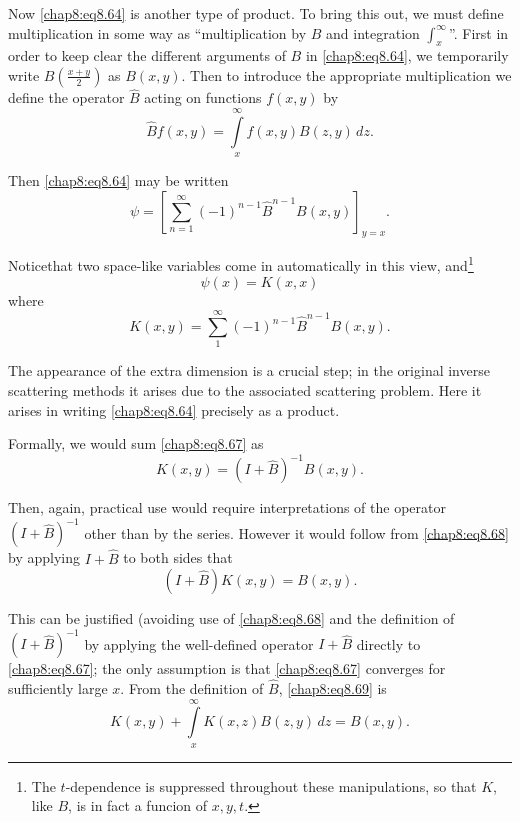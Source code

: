 Now \eqref{chap8:eq8.64} is another type of product. To bring this out, we must define multiplication in some way as ``multiplication by $B$ and integration $\int_x^\infty$''. First in order to keep clear the different arguments of $B$ in \eqref{chap8:eq8.64}, we temporarily write $B(\frac{x+y}{2})$ as $B(x,y)$. Then to introduce the appropriate multiplication we define the operator $\hat{B}$ acting on functions $f(x,y)$ by 
\begin{equation}
\hat{B}f(x,y)=\int\limits_x^\infty f(x,y)B(z,y)\,dz. \tag{8.65}\label{chap8:eq8.65}
\end{equation}

Then \eqref{chap8:eq8.64} may be written 
\begin{equation}
\psi=\left[\sum\limits_{n=1}^\infty(-1)^{n-1}\hat{B}^{n-1}B(x,y)\right]_{y=x}. \tag{8.66}\label{chap8:eq8.66}
\end{equation}

Notice\pageoriginale that two space-like variables come in automatically in this view, and\footnote{The $t$-dependence is suppressed throughout these manipulations, so that $K$, like $B$, is in fact a funcion of $x,y,t$.}
$$
\psi(x)=K(x,x)
$$
where
\begin{equation}
K(x,y)=\sum\limits_1^\infty (-1)^{n-1}\hat{B}^{n-1}B(x,y). \tag{8.67}\label{chap8:eq8.67}
\end{equation}

The appearance of the extra dimension is a crucial step; in the original inverse scattering methods it arises due to the associated scattering problem. Here it arises in writing \eqref{chap8:eq8.64} precisely as a product.

Formally, we would sum \eqref{chap8:eq8.67} as 
\begin{equation}
K(x,y)=(I+ \hat{B})^{-1}B(x,y).\tag{8.68}\label{chap8:eq8.68}
\end{equation}

Then, again, practical use would require interpretations of the operator $(I+\hat{B})^{-1}$ other than by the series. However it would follow from \eqref{chap8:eq8.68} by applying $I+\hat{B}$ to both sides that 
\begin{equation}
(I+\hat{B})K(x,y)=B(x,y).\tag{8.69}\label{chap8:eq8.69}
\end{equation}

This can be justified (avoiding use of \eqref{chap8:eq8.68} and the definition of $(I+\hat{B})^{-1}$ by applying the well-defined operator $I+\hat{B}$ directly to \eqref{chap8:eq8.67}; the only assumption is that \eqref{chap8:eq8.67} converges for sufficiently large $x$. From the definition of $\hat{B}$, \eqref{chap8:eq8.69} is 
\begin{equation}
K(x,y)+\int\limits_x^\infty K(x,z)B(z,y)\,dz=B(x,y). \tag{8.70}\label{chap8:eq8.70}
\end{equation}

